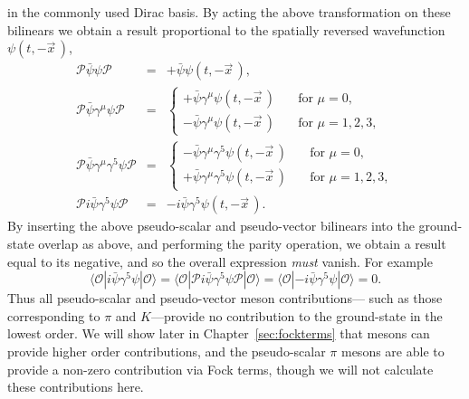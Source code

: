 \documentclass[11pt,a4paper,twoside]{carrollthesis}
\newcommand{\be}{\begin{equation}}
\newcommand{\ee}{\end{equation}}
\newcommand{\bea}{\begin{eqnarray}}
\newcommand{\eea}{\end{eqnarray}}
\newcommand{\emdash}{\hspace{1pt}---\hspace{1pt}}
\begin{document}
in the commonly used Dirac basis. By acting the above transformation
on these bilinears we obtain a result proportional to the spatially
reversed wavefunction $\psi(t,-\vec{x}\, )$,
%
\bea \mathcal{P}\bar{\psi}\psi \mathcal{P} &=&
+\bar{\psi}\psi(t,-\vec{x}\, ),\\[3mm]
\mathcal{P}\bar{\psi}\gamma^\mu\psi \mathcal{P} &=& \left\{
   \begin{array}{ll}
     +\bar{\psi}\gamma^\mu\psi(t,-\vec{x}\, ) &\quad \mbox{for\ }
     \mu=0,\\ -\bar{\psi}\gamma^\mu\psi(t,-\vec{x}\, ) &\quad \mbox{for\ }
     \mu=1,2,3,
   \end{array}
\right.\\[3mm] \mathcal{P}\bar{\psi}\gamma^\mu\gamma^5\psi
\mathcal{P} &=& \left\{
   \begin{array}{ll}
     -\bar{\psi}\gamma^\mu\gamma^5\psi(t,-\vec{x}\, ) &\quad \mbox{for\ }
     \mu=0,\\ +\bar{\psi}\gamma^\mu\gamma^5\psi(t,-\vec{x}\, ) &\quad
     \mbox{for\ } \mu=1,2,3,
   \end{array}
\right.\\[3mm] \mathcal{P}i\bar{\psi}\gamma^5\psi \mathcal{P} &=&
-i\bar{\psi}\gamma^5\psi(t,-\vec{x}\, ).
\eea
%
By inserting the above pseudo-scalar and pseudo-vector bilinears into
the ground-state overlap as above, and performing the parity
operation, we obtain a result equal to its negative, and so the
overall expression \emph{must} vanish. For example
%
\be \langle \mathcal{O} | i\bar{\psi}\gamma^5\psi | \mathcal{O}
\rangle = \langle \mathcal{O} | \mathcal{P} i\bar{\psi}\gamma^5\psi
\mathcal{P} | \mathcal{O} \rangle = \langle \mathcal{O} |
-i\bar{\psi}\gamma^5\psi | \mathcal{O} \rangle 
= 0. \ee
%
Thus all pseudo-scalar and pseudo-vector meson contributions\emdash
such as those corresponding to $\pi$ and $K$\emdash provide no
contribution to the ground-state in the lowest order. We will show
later in Chapter~\ref{sec:fockterms} that mesons can provide higher
order contributions, and the pseudo-scalar $\pi$ mesons are able to
provide a non-zero contribution via Fock terms, though we will not
calculate these contributions here.\par
%
\end{document}
